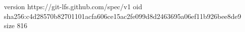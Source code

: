 version https://git-lfs.github.com/spec/v1
oid sha256:c4d28570b82701101acfa606ce15ac2fe099d8d2463695a06ef11b926bee8de9
size 816
